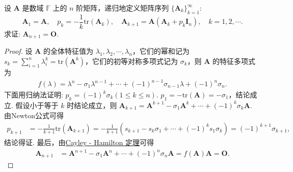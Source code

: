 \documentclass[../../main.tex]{subfiles}
\begin{document}
\begin{example}
设 $\boldsymbol{A}$ 是数域 $\mathbb{F}$ 上的 $n$ 阶矩阵，递归地定义矩阵序列 $\{\boldsymbol{A}_k\}_{k = 1}^{\infty}$:
\[
\boldsymbol{A}_1=\boldsymbol{A}, \quad
p_k=-\frac{1}{k}\mathrm{tr}(\boldsymbol{A}_k), \quad
\boldsymbol{A}_{k + 1}=\boldsymbol{A}(\boldsymbol{A}_k + p_k\boldsymbol{I}_n), \quad k = 1,2,\cdots.
\]
求证: $\boldsymbol{A}_{n + 1}=\boldsymbol{O}$.
\end{example}
\begin{proof}
设 $\boldsymbol{A}$ 的全体特征值为 $\lambda_1,\lambda_2,\cdots,\lambda_n$，它们的幂和记为 $s_k=\sum_{i = 1}^{n}\lambda_i^k=\mathrm{tr}(\boldsymbol{A}^k)$，它们的初等对称多项式记为 $\sigma_k$，则 $\boldsymbol{A}$ 的特征多项式为
\begin{align*}
f(\lambda)=\lambda^n - \sigma_1\lambda^{n - 1}+\cdots + (-1)^{n - 1}\sigma_{n - 1}\lambda + (-1)^n\sigma_n.
\end{align*}
下面用归纳法证明: $p_k = (-1)^k\sigma_k (1\leqslant  k\leqslant  n)$. $p_1 = -\mathrm{tr}(\boldsymbol{A}) = -\sigma_1$，结论成立. 假设小于等于 $k$ 时结论成立，则 $\boldsymbol{A}_{k + 1}=\boldsymbol{A}^{k + 1} - \sigma_1\boldsymbol{A}^k+\cdots + (-1)^k\sigma_k\boldsymbol{A}$. 由Newton公式可得
\begin{align*}
p_{k + 1}&=-\frac{1}{k + 1}\mathrm{tr}(\boldsymbol{A}_{k + 1})=-\frac{1}{k + 1}(s_{k + 1} - s_k\sigma_1+\cdots + (-1)^k s_1\sigma_k)=(-1)^{k + 1}\sigma_{k + 1},
\end{align*}
结论得证. 最后，由\hyperref[theorem:Cayley-Hamilton定理]{Cayley - Hamilton 定理}可得
\begin{align*}
\boldsymbol{A}_{n + 1}&=\boldsymbol{A}^{n + 1} - \sigma_1\boldsymbol{A}^n+\cdots + (-1)^n\sigma_n\boldsymbol{A}=f(\boldsymbol{A})\boldsymbol{A}=\boldsymbol{O}.
\end{align*} 
\end{proof}
\end{document}
